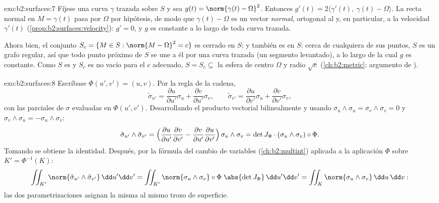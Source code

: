 \begin{solution}{exo:b2:surfaces:7}
Fíjese una curva $\gamma$ trazada sobre $S$ y sea $g(t) =
\norm{\gamma(t) - \Omega}^2$. Entonces $g'(t) = 2\langle
\gamma'(t),\ \gamma(t) - \Omega\rangle$. La recta normal en $M =
\gamma(t)$ pasa por $\Omega$ por hipótesis, de modo que $\gamma(t) -
\Omega$ es un vector \emph{normal}, ortogonal al  y,
en particular, a la velocidad $\gamma'(t)$
(\cref{prop:b2:surfaces:velocity}): $g' = 0$, y $g$ es constante a lo
largo de toda curva trazada.

Ahora bien, el conjunto $S_c = \{M \in S : \norm{M - \Omega}^2 = c\}$
es cerrado en $S$; y también es  en $S$: cerca de cualquiera de
sus puntos, $S$ es un grafo regular, así que todo punto próximo de
$S$ se une a él por una curva trazada (un segmento levantado), a lo
largo de la cual $g$ es constante. Como $S$ es  y $S_c$ es no
vacío para el $c$ adecuado, $S = S_c \subseteq$ la esfera de centro
$\Omega$ y radio $\sqrt c$ (\cref{ch:b2:metric}: argumento de
).
\end{solution}

\begin{solution}{exo:b2:surfaces:8}
Escríbase $\Phi(u', v') = (u, v)$. Por la regla de la cadena,
\[
\tilde\sigma_{u'} = \frac{\partial u}{\partial u'}\sigma_u
+ \frac{\partial v}{\partial u'}\sigma_v,
\qquad
\tilde\sigma_{v'} = \frac{\partial u}{\partial v'}\sigma_u
+ \frac{\partial v}{\partial v'}\sigma_v ,
\]
con las parciales de $\sigma$ evaluadas en $\Phi(u',v')$.
Desarrollando el producto vectorial bilinealmente y usando $\sigma_u
\wedge \sigma_u = \sigma_v \wedge \sigma_v = 0$ y $\sigma_v \wedge
\sigma_u = -\sigma_u \wedge \sigma_v$:
\[
\tilde\sigma_{u'} \wedge \tilde\sigma_{v'}
= \Bigl(\frac{\partial u}{\partial u'}
\frac{\partial v}{\partial v'}
- \frac{\partial v}{\partial u'}
\frac{\partial u}{\partial v'}\Bigr)\,
\sigma_u \wedge \sigma_v
= \det J_\Phi \cdot (\sigma_u \wedge \sigma_v)\circ\Phi .
\]
Tomando  se obtiene la identidad. Después, por la fórmula del
cambio de variables (\cref{ch:b2:multint}) aplicada a la aplicación
$\Phi$ sobre $K' = \Phi^{-1}(K)$:
\[
\iint_{K'} \norm{\tilde\sigma_{u'} \wedge \tilde\sigma_{v'}}
\,\dd u'\dd v'
= \iint_{K'} \norm{\sigma_u \wedge \sigma_v}\circ\Phi\;
\abs{\det J_\Phi}\,\dd u'\dd v'
= \iint_K \norm{\sigma_u \wedge \sigma_v}\,\dd u\,\dd v :
\]
las dos parametrizaciones asignan la misma  al mismo trozo de
superficie.
\end{solution}

